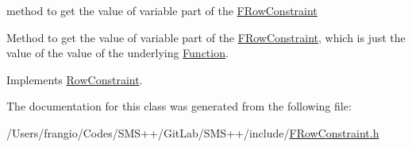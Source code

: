 method to get the value of variable part of the \mbox{\hyperlink{class_s_m_spp__di__unipi__it_1_1_f_row_constraint}{F\+Row\+Constraint}} 

Method to get the value of variable part of the \mbox{\hyperlink{class_s_m_spp__di__unipi__it_1_1_f_row_constraint}{F\+Row\+Constraint}}, which is just the value of the value of the underlying \mbox{\hyperlink{class_s_m_spp__di__unipi__it_1_1_function}{Function}}. 

Implements \mbox{\hyperlink{class_s_m_spp__di__unipi__it_1_1_row_constraint_a42562ba0a608bdc52a80a2bb512d0603}{Row\+Constraint}}.



The documentation for this class was generated from the following file\+:\begin{DoxyCompactItemize}
\item 
/\+Users/frangio/\+Codes/\+S\+M\+S++/\+Git\+Lab/\+S\+M\+S++/include/\mbox{\hyperlink{_f_row_constraint_8h}{F\+Row\+Constraint.\+h}}\end{DoxyCompactItemize}
